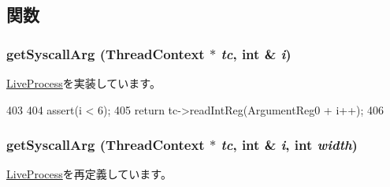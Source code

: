 \subsection{関数}
\hypertarget{classArmLiveProcess32_acd6c1a25855e6ca42789dd97c86a17ac}{
\subsubsection[{getSyscallArg}]{ getSyscallArg ({\bf ThreadContext} $\ast$ {\em tc}, \/  int \& {\em i})}}
\label{classArmLiveProcess32_acd6c1a25855e6ca42789dd97c86a17ac}


\hyperlink{classLiveProcess_aa001ff57ec460026facb89ba19c7bf96}{LiveProcess}を実装しています。


\begin{DoxyCode}
403 {
404     assert(i < 6);
405     return tc->readIntReg(ArgumentReg0 + i++);
406 }
\end{DoxyCode}
\hypertarget{classArmLiveProcess32_a52c7542cca5e7218361e5d1baf236cb2}{
\subsubsection[{getSyscallArg}]{ getSyscallArg ({\bf ThreadContext} $\ast$ {\em tc}, \/  int \& {\em i}, \/  int {\em width})}}
\label{classArmLiveProcess32_a52c7542cca5e7218361e5d1baf236cb2}


\hyperlink{classLiveProcess_a383f46521b8667b58a1275f2a3e2fda1}{LiveProcess}を再定義しています。


